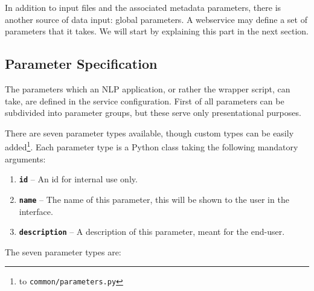 \documentclass[a4paper,12pt]{report}
\begin{document}
In addition to input files and the associated metadata parameters, there is another source of data input: global parameters. A webservice may define a set of parameters that it takes. We will start by explaining this part in the next section.


\subsection{Parameter Specification}
\label{sec:parameters}

The parameters which an NLP application, or rather the wrapper script, can take, are defined in the service configuration. First of all parameters can be subdivided into parameter groups, but these serve only presentational purposes. 

There are seven parameter types available, though custom types can be easily added\footnote{to \texttt{common/parameters.py}}. Each parameter type is a Python class taking the following mandatory arguments:

\begin{enumerate}
\item \textbf{\texttt{id}} -- An id for internal use only.
\item \textbf{\texttt{name}} -- The name of this parameter, this will be shown to the user in the interface.
\item \textbf{\texttt{description}} -- A description of this parameter, meant for the end-user.
\end{enumerate}

The seven parameter types are:
\end{document}
